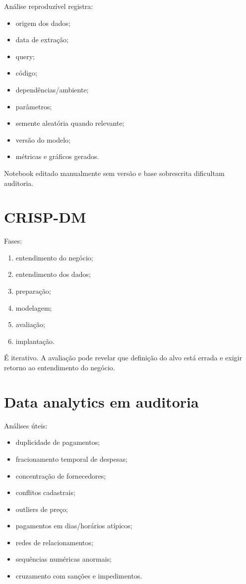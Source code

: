 Análise reproduzível registra:
\begin{itemize}
\item origem dos dados;
\item data de extração;
\item query;
\item código;
\item dependências/ambiente;
\item parâmetros;
\item semente aleatória quando relevante;
\item versão do modelo;
\item métricas e gráficos gerados.
\end{itemize}

Notebook editado manualmente sem versão e base sobrescrita dificultam auditoria.

\section{CRISP-DM}

Fases:
\begin{enumerate}
\item entendimento do negócio;
\item entendimento dos dados;
\item preparação;
\item modelagem;
\item avaliação;
\item implantação.
\end{enumerate}

É iterativo. A avaliação pode revelar que definição do alvo está errada e exigir retorno ao entendimento do negócio.

\section{Data analytics em auditoria}

Análises úteis:
\begin{itemize}
\item duplicidade de pagamentos;
\item fracionamento temporal de despesas;
\item concentração de fornecedores;
\item conflitos cadastrais;
\item outliers de preço;
\item pagamentos em dias/horários atípicos;
\item redes de relacionamentos;
\item sequências numéricas anormais;
\item cruzamento com sanções e impedimentos.
\end{itemize}

